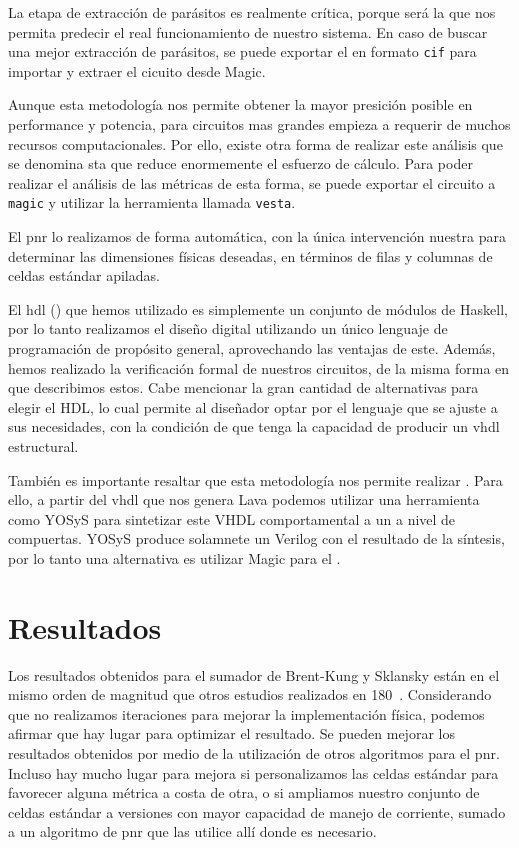 La etapa de extracción de parásitos es realmente crítica, porque será la que nos permita predecir el real funcionamiento de nuestro sistema. En caso de buscar una mejor extracción de parásitos, se puede exportar el \layout en formato \verb.cif. para importar y extraer el cicuito desde Magic.

Aunque esta metodología nos permite obtener la mayor presición posible en performance y potencia, para circuitos mas grandes empieza a requerir de muchos recursos computacionales. Por ello, existe otra forma de realizar este análisis que se denomina \gls{sta} que reduce enormemente el esfuerzo de cálculo. Para poder realizar el análisis de las métricas de esta forma, se puede exportar el circuito a \verb.magic. y utilizar la herramienta llamada \verb.vesta.. 

El \gls{pnr} lo realizamos de forma automática, con la única intervención nuestra para determinar las dimensiones físicas deseadas, en términos de filas y columnas de celdas estándar apiladas.

El \gls{hdl} () que hemos utilizado es simplemente un conjunto de módulos de Haskell, por lo tanto realizamos el diseño digital utilizando un único lenguaje de programación de propósito general, aprovechando las ventajas de este. Además, hemos realizado la verificación formal de nuestros circuitos, de la misma forma en que describimos estos. Cabe mencionar la gran cantidad de alternativas para elegir el HDL, lo cual permite al diseñador optar por el lenguaje que se ajuste a sus necesidades, con la condición de que tenga la capacidad de producir un  \gls{vhdl} estructural.

También es importante resaltar que esta metodología nos permite realizar . Para ello, a partir del \gls{vhdl} que nos genera Lava podemos utilizar una herramienta como YOSyS\cite{Yosys} para sintetizar este VHDL comportamental a un  a nivel de compuertas. YOSyS produce solamnete un  Verilog con el resultado de la síntesis, por lo tanto una alternativa es utilizar Magic para el \layout.

\section{Resultados}
Los resultados obtenidos para el sumador de Brent-Kung y Sklansky están en el mismo orden de magnitud que otros estudios\cite{ramanathan,Chatterjee} realizados en 180~\nanom. Considerando que no realizamos iteraciones para mejorar la implementación física, podemos afirmar que hay lugar para optimizar el resultado. Se pueden mejorar los resultados obtenidos por medio de la utilización de otros algoritmos para el \gls{pnr}. Incluso hay mucho lugar para mejora si personalizamos las celdas estándar para favorecer alguna métrica a costa de otra, o si ampliamos nuestro conjunto de celdas estándar a versiones con mayor capacidad de manejo de corriente, sumado a un algoritmo de \gls{pnr} que las utilice allí donde es necesario.


